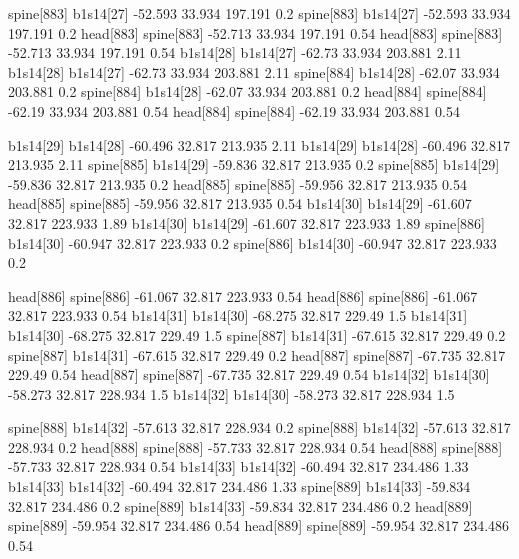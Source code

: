 spine[883]    b1s14[27]    -52.593    33.934    197.191    0.2
spine[883]    b1s14[27]    -52.593    33.934    197.191    0.2
head[883]    spine[883]    -52.713    33.934    197.191    0.54
head[883]    spine[883]    -52.713    33.934    197.191    0.54
b1s14[28]    b1s14[27]    -62.73    33.934    203.881    2.11
b1s14[28]    b1s14[27]    -62.73    33.934    203.881    2.11
spine[884]    b1s14[28]    -62.07    33.934    203.881    0.2
spine[884]    b1s14[28]    -62.07    33.934    203.881    0.2
head[884]    spine[884]    -62.19    33.934    203.881    0.54
head[884]    spine[884]    -62.19    33.934    203.881    0.54


b1s14[29]    b1s14[28]    -60.496    32.817    213.935    2.11
b1s14[29]    b1s14[28]    -60.496    32.817    213.935    2.11
spine[885]    b1s14[29]    -59.836    32.817    213.935    0.2
spine[885]    b1s14[29]    -59.836    32.817    213.935    0.2
head[885]    spine[885]    -59.956    32.817    213.935    0.54
head[885]    spine[885]    -59.956    32.817    213.935    0.54
b1s14[30]    b1s14[29]    -61.607    32.817    223.933    1.89
b1s14[30]    b1s14[29]    -61.607    32.817    223.933    1.89
spine[886]    b1s14[30]    -60.947    32.817    223.933    0.2
spine[886]    b1s14[30]    -60.947    32.817    223.933    0.2


head[886]    spine[886]    -61.067    32.817    223.933    0.54
head[886]    spine[886]    -61.067    32.817    223.933    0.54
b1s14[31]    b1s14[30]    -68.275    32.817    229.49    1.5
b1s14[31]    b1s14[30]    -68.275    32.817    229.49    1.5
spine[887]    b1s14[31]    -67.615    32.817    229.49    0.2
spine[887]    b1s14[31]    -67.615    32.817    229.49    0.2
head[887]    spine[887]    -67.735    32.817    229.49    0.54
head[887]    spine[887]    -67.735    32.817    229.49    0.54
b1s14[32]    b1s14[30]    -58.273    32.817    228.934    1.5
b1s14[32]    b1s14[30]    -58.273    32.817    228.934    1.5


spine[888]    b1s14[32]    -57.613    32.817    228.934    0.2
spine[888]    b1s14[32]    -57.613    32.817    228.934    0.2
head[888]    spine[888]    -57.733    32.817    228.934    0.54
head[888]    spine[888]    -57.733    32.817    228.934    0.54
b1s14[33]    b1s14[32]    -60.494    32.817    234.486    1.33
b1s14[33]    b1s14[32]    -60.494    32.817    234.486    1.33
spine[889]    b1s14[33]    -59.834    32.817    234.486    0.2
spine[889]    b1s14[33]    -59.834    32.817    234.486    0.2
head[889]    spine[889]    -59.954    32.817    234.486    0.54
head[889]    spine[889]    -59.954    32.817    234.486    0.54


